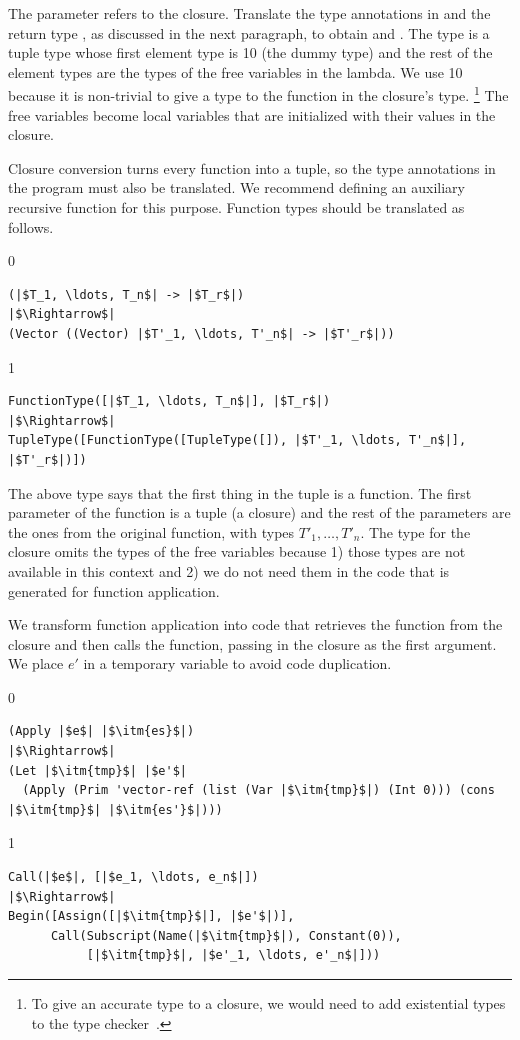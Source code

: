 \documentclass[7x10,nocrop]{TimesAPriori_MIT}%
\def\racketEd{0}
\def\pythonEd{1}
\def\edition{1}
\newcommand{\racket}[1]{{\if\edition\racketEd{#1}\fi}}
\newcommand{\python}[1]{{\if\edition\pythonEd #1\fi}}
\begin{document}
The  parameter refers to the closure.  Translate the type
annotations in  and the return type , as discussed in
the next paragraph, to obtain  and .  The type
 is a tuple type whose first element type is
\python{}\racket{\code{\_} (the dummy type)} and the rest of
the element types are the types of the free variables in the
lambda. We use \python{}\racket{\code{\_}} because it
is non-trivial to give a type to the function in the closure's type.%
%
\footnote{To give an accurate type to a closure, we would need to add
  existential types to the type checker~\citep{Minamide:1996ys}.}
%
The free variables become local variables that are initialized with
their values in the closure.

Closure conversion turns every function into a tuple, so the type
annotations in the program must also be translated.  We recommend
defining an auxiliary recursive function for this purpose.  Function
types should be translated as follows.
%
{\if\edition\racketEd
\begin{lstlisting}
(|$T_1, \ldots, T_n$| -> |$T_r$|)
|$\Rightarrow$|  
(Vector ((Vector) |$T'_1, \ldots, T'_n$| -> |$T'_r$|))
\end{lstlisting}
\fi}
{\if\edition\pythonEd
\begin{lstlisting}
FunctionType([|$T_1, \ldots, T_n$|], |$T_r$|)
|$\Rightarrow$|  
TupleType([FunctionType([TupleType([]), |$T'_1, \ldots, T'_n$|], |$T'_r$|)])
\end{lstlisting}
\fi}
%
The above type says that the first thing in the tuple is a
function. The first parameter of the function is a tuple (a closure)
and the rest of the parameters are the ones from the original
function, with types $T'_1, \ldots, T'_n$.  The type for the closure
omits the types of the free variables because 1) those types are not
available in this context and 2) we do not need them in the code that
is generated for function application.

We transform function application into code that retrieves the
function from the closure and then calls the function, passing in the
closure as the first argument. We place $e'$ in a temporary variable
to avoid code duplication.
\begin{center}
\begin{minipage}{\textwidth}
{\if\edition\racketEd
\begin{lstlisting}
(Apply |$e$| |$\itm{es}$|)
|$\Rightarrow$|
(Let |$\itm{tmp}$| |$e'$|
  (Apply (Prim 'vector-ref (list (Var |$\itm{tmp}$|) (Int 0))) (cons |$\itm{tmp}$| |$\itm{es'}$|)))
\end{lstlisting}
\fi}
%
{\if\edition\pythonEd
\begin{lstlisting}
Call(|$e$|, [|$e_1, \ldots, e_n$|])
|$\Rightarrow$|
Begin([Assign([|$\itm{tmp}$|], |$e'$|)],
      Call(Subscript(Name(|$\itm{tmp}$|), Constant(0)),
           [|$\itm{tmp}$|, |$e'_1, \ldots, e'_n$|]))
\end{lstlisting}
\fi}
\end{minipage}
\end{center}
\end{document}
